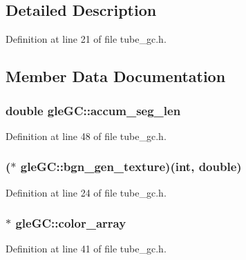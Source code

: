 \subsection{Detailed Description}


Definition at line 21 of file tube\-\_\-gc.\-h.



\subsection{Member Data Documentation}
\hypertarget{structgle_g_c_abbc1d404357bb81195b142b599048c39}{
\subsubsection[{accum\-\_\-seg\-\_\-len}]{\setlength{\rightskip}{0pt plus 5cm}double gle\-G\-C\-::accum\-\_\-seg\-\_\-len}}\label{structgle_g_c_abbc1d404357bb81195b142b599048c39}


Definition at line 48 of file tube\-\_\-gc.\-h.

\hypertarget{structgle_g_c_ac8d73eb4813e98a7e32496f75ea18caf}{
\subsubsection[{bgn\-\_\-gen\-\_\-texture}]{($\ast$ gle\-G\-C\-::bgn\-\_\-gen\-\_\-texture)(int, double)}}\label{structgle_g_c_ac8d73eb4813e98a7e32496f75ea18caf}


Definition at line 24 of file tube\-\_\-gc.\-h.

\hypertarget{structgle_g_c_aede9d35db134a66dc25b879039ac9646}{
\subsubsection[{color\-\_\-array}]{$\ast$ gle\-G\-C\-::color\-\_\-array}}\label{structgle_g_c_aede9d35db134a66dc25b879039ac9646}


Definition at line 41 of file tube\-\_\-gc.\-h.

